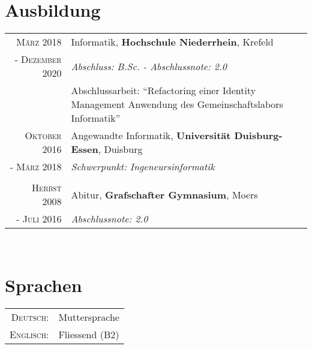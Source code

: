 \documentclass[10pt,a4paper]{article}
\begin{document}
\section{Ausbildung}

\begin{tabular}{r|p{11cm}}
	\textsc{M\"arz} 2018		& Informatik, \textbf{Hochschule Niederrhein}, Krefeld \\
	- \textsc{Dezember 2020}	& \emph{Abschluss: B.Sc. - Abschlussnote: 2.0} \\
	& Abschlussarbeit: ``Refactoring einer Identity Management Anwendung des Gemeinschaftslabors Informatik''
	\multicolumn{2}{c}{} \\
	
	\textsc{Oktober} 2016	& Angewandte Informatik, \textbf{Universit\"at Duisburg-Essen}, Duisburg \\
	- \textsc{M\"arz} 2018	& \emph{Schwerpunkt: Ingeneursinformatik} \\
	\multicolumn{2}{c}{} \\
	
	\textsc{Herbst} 2008		& Abitur, \textbf{Grafschafter Gymnasium}, Moers \\
	- \textsc{Juli} 2016		& \emph{Abschlussnote: 2.0} \\
\end{tabular} \\

\newpage


%
%
%
\nocite{*}
\printbibliography[title={Publikationen}]


\section{Sprachen}

\begin{tabular}{rl}
	\textsc{Deutsch:}		& Muttersprache \\
	\textsc{Englisch:}		& Fliessend (B2) \\
\end{tabular} \\
\end{document}
